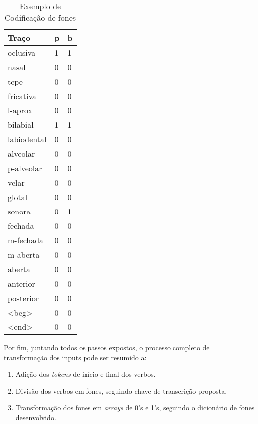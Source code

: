 \begin{table}[H]
\begin{center}
\begin{tabular}{lll}
\textbf{ Traço} & \textbf{p} &\textbf{ b} \\
 \toprule
oclusiva & 1 & 1 \\
nasal & 0 & 0 \\
tepe & 0 & 0 \\
fricativa & 0 & 0 \\
l-aprox & 0 & 0 \\
bilabial & 1 & 1 \\
labiodental & 0 & 0 \\
alveolar & 0 & 0 \\
p-alveolar & 0 & 0 \\
velar & 0 & 0 \\
glotal & 0 & 0 \\
sonora & 0 & 1 \\
fechada & 0 & 0 \\
m-fechada & 0 & 0 \\
m-aberta & 0 & 0 \\
aberta & 0 & 0 \\
anterior & 0 & 0 \\
posterior & 0 & 0 \\
<beg> & 0 & 0 \\
<end> & 0 & 0
\end{tabular}
\end{center}
\caption{Exemplo de Codificação de fones}
\label{tab:coding_example}
\end{table}

Por fim, juntando todos os passos expostos, o processo completo de transformação dos inputs pode ser resumido a:

\begin{enumerate}
    \item Adição dos \textit{tokens} de início e final dos verbos.
    \item Divisão dos verbos em fones, seguindo chave de transcrição proposta.
    \item Transformação dos fones em \textit{arrays} de 0's e 1's, seguindo o dicionário de fones desenvolvido.
\end{enumerate}





